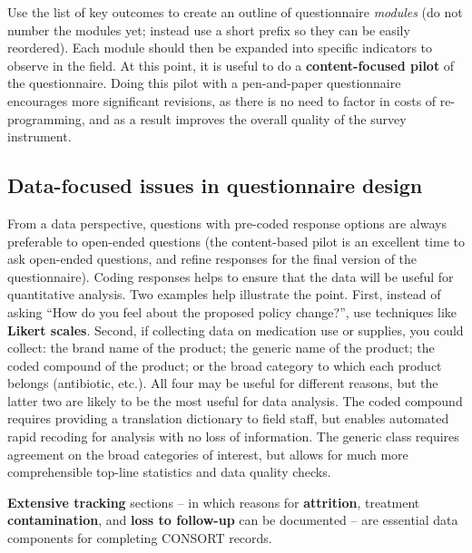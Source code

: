 Use the list of key outcomes to create an outline of questionnaire \textit{modules} (do not number the modules yet; instead use a short prefix so they can be easily reordered). Each module should then be expanded into specific indicators to observe in the field.
At this point, it is useful to do a 
\textbf{content-focused pilot}  of the questionnaire. 
Doing this pilot with a pen-and-paper questionnaire encourages more significant revisions, as there is no need to factor in costs of re-programming, and as a result improves the overall quality of the survey instrument. 

\subsection{Data-focused issues in questionnaire design}

From a data perspective, questions with pre-coded response options are always preferable to open-ended questions (the content-based pilot is an excellent time to ask open-ended questions, and refine responses for the final version of the questionnaire). Coding responses helps to ensure that the data will be useful for quantitative analysis. Two examples help illustrate the point. First, instead of asking ``How do you feel about the proposed policy change?'', use techniques like 
\textbf{Likert scales}. Second, if collecting data on medication use or supplies, you could collect: the brand name of the product; the generic name of the product; the coded compound of the product; or the broad category to which each product belongs (antibiotic, etc.). All four may be useful for different reasons, but the latter two are likely to be the most useful for data analysis. The coded compound requires providing a translation dictionary to field staff, but enables automated rapid recoding for analysis with no loss of information. The generic class requires agreement on the broad categories of interest, but allows for much more comprehensible top-line statistics and data quality checks.

\textbf{Extensive tracking} sections -- in which reasons for \textbf{attrition}, treatment \textbf{contamination}, and \textbf{loss to follow-up} can be documented --
are essential data components for completing CONSORT
records.


